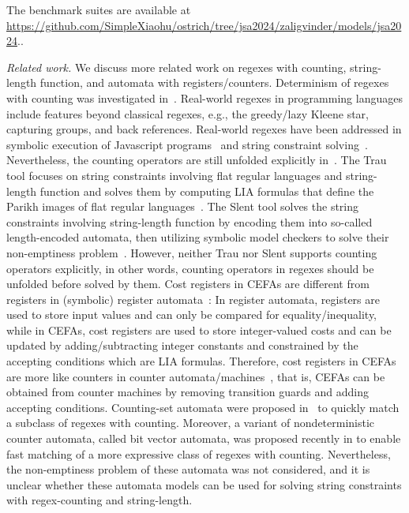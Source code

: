 \begin{itemize}
{{The benchmark suites are available at \url{https://github.com/SimpleXiaohu/ostrich/tree/jsa2024/zaligvinder/models/jsa2024}.}}. 
%
\end{itemize}

\medskip
\noindent
\emph{Related work.} 
We discuss more related work on regexes with counting, string-length function, and automata with registers/counters.  
%
Determinism of regexes with counting was investigated in~\cite{GGM12,CL15}. 
%
Real-world regexes in programming languages include features beyond classical regexes, e.g., the greedy/lazy Kleene star, capturing groups, and back references. Real-world regexes have been addressed in symbolic execution of Javascript programs~\cite{LMK19} and string constraint solving~\cite{CF+22}. 
Nevertheless, the counting operators are still unfolded explicitly in~\cite{CF+22}. 
%
The Trau tool focuses on string constraints involving flat regular languages and string-length function and solves them by computing LIA formulas that define the Parikh images of flat regular languages~\cite{z3trau}. The Slent tool solves the string constraints involving string-length function by encoding them into so-called length-encoded automata, then utilizing symbolic model checkers to solve their non-emptiness problem~\cite{WC+18}. However, neither Trau nor Slent supports counting operators explicitly, in other words, counting operators in regexes should be unfolded before solved by them.
%
Cost registers in CEFAs are different from registers in (symbolic) register automata~\cite{ra,sra}:  In register automata, registers are used to store input values and can only be compared for equality/inequality, while in CEFAs, cost registers are used to store integer-valued costs and can be updated by adding/subtracting integer constants and constrained by the accepting conditions which are LIA formulas.
%
Therefore, cost registers in CEFAs are more like counters in counter automata/machines~\cite{Minsky67}, that is, CEFAs can be obtained from counter machines by removing transition guards and adding accepting conditions. 
%
%
Counting-set automata were proposed in~\cite{redos_lenka,HS+23} to quickly match a subclass of regexes with counting. Moreover, a variant of nondeterministic counter automata, called bit vector automata, was proposed recently in \cite{GKM23} to enable fast matching of a more expressive class of regexes with counting.   Nevertheless, the non-emptiness problem of these automata was not considered, and it is unclear whether these automata models can be used for solving string constraints with regex-counting and string-length. 

